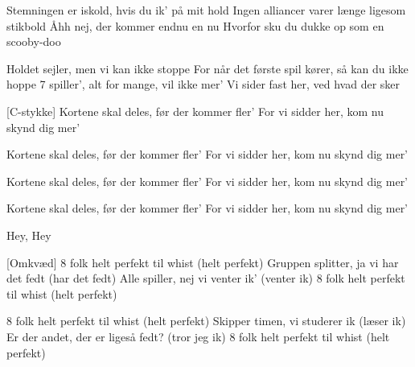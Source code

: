 \documentclass[a4paper,11pt]{article}
\begin{document}
\begin{song}
 Stemningen er iskold, hvis du ik' på mit hold
    Ingen alliancer varer længe ligesom stikbold
    Åhh nej, der kommer endnu en nu
    Hvorfor sku du dukke op som en scooby-doo


 Holdet sejler, men vi kan ikke stoppe
    For når det første spil kører, så kan du ikke hoppe
    7 spiller', alt for mange, vil ikke mer'
    Vi sider fast her, ved hvad der sker

[C-stykke] Kortene skal deles, før der kommer fler'
    For vi sidder her, kom nu skynd dig mer'

    Kortene skal deles, før der kommer fler'
    For vi sidder her, kom nu skynd dig mer'

    Kortene skal deles, før der kommer fler'
    For vi sidder her, kom nu skynd dig mer'

    Kortene skal deles, før der kommer fler'
    For vi sidder her, kom nu skynd dig mer'


 Hey, Hey

[Omkvæd] 8 folk helt perfekt til whist (helt perfekt)
    Gruppen splitter, ja vi har det fedt (har det fedt)
    Alle spiller, nej vi venter ik' (venter ik)
    8 folk helt perfekt til whist (helt perfekt)

 8 folk helt perfekt til whist (helt perfekt)
    Skipper timen, vi studerer ik (læser ik)
    Er der andet, der er ligeså fedt? (tror jeg ik)
    8 folk helt perfekt til whist (helt perfekt)
\end{song}
\end{document}
